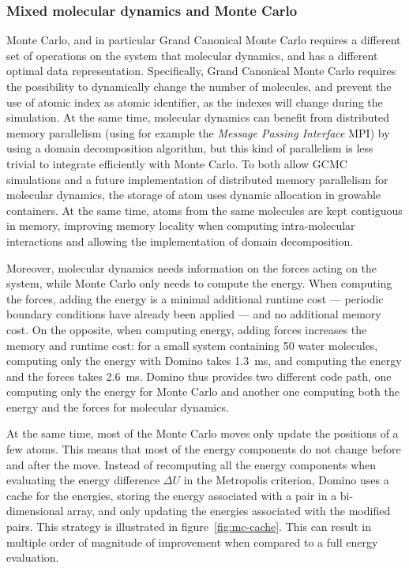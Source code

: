 \documentclass[thesis]{subfiles}
\begin{document}
\subsubsection{Mixed molecular dynamics and Monte Carlo}

Monte Carlo, and in particular Grand Canonical Monte Carlo requires a different
set of operations on the system that molecular dynamics, and has a different
optimal data representation. Specifically, Grand Canonical Monte Carlo requires
the possibility to dynamically change the number of molecules, and prevent the
use of atomic index as atomic identifier, as the indexes will change during the
simulation. At the same time, molecular dynamics can benefit from distributed
memory parallelism (using for example the \emph{Message Passing Interface} MPI)
by using a domain decomposition algorithm, but this kind of parallelism is less
trivial to integrate efficiently with Monte Carlo. To both allow GCMC
simulations and a future implementation of distributed memory parallelism for
molecular dynamics, the storage of atom uses dynamic allocation in growable
containers. At the same time, atoms from the same molecules are kept contiguous
in memory, improving memory locality when computing intra-molecular interactions
and allowing the implementation of domain decomposition.

Moreover, molecular dynamics needs information on the forces acting on the
system, while Monte Carlo only needs to compute the energy. When computing the
forces, adding the energy is a minimal additional runtime cost --- periodic
boundary conditions have already been applied --- and no additional memory cost.
On the opposite, when computing energy, adding forces increases the memory and
runtime cost: for a small system containing 50 water molecules, computing only
the energy with Domino takes \SI{1.3}{ms}, and computing the energy and the
forces takes \SI{2.6}{ms}. Domino thus provides two different code path, one
computing only the energy for Monte Carlo and another one computing both the
energy and the forces for molecular dynamics.

At the same time, most of the Monte Carlo moves only update the positions of a
few atoms. This means that most of the energy components do not change before
and after the move. Instead of recomputing all the energy components when
evaluating the energy difference $\Delta U$ in the Metropolis criterion, Domino
uses a cache for the energies, storing the energy associated with a pair in a
bi-dimensional array, and only updating the energies associated with the
modified pairs. This strategy is illustrated in figure~\ref{fig:mc-cache}. This
can result in multiple order of magnitude of improvement when compared to a full
energy evaluation.
\end{document}
